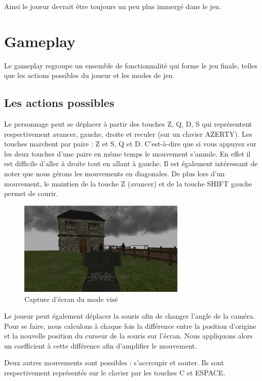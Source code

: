 \documentclass[11pt]{report}
\begin{document}
Ainsi le joueur devrait être toujours un peu plus immergé dans le jeu.

\chapter{Gameplay}

Le gameplay regroupe un ensemble de fonctionnalité qui forme le jeu finale, telles que les actions possibles du joueur et les modes de jeu.

\section{Les actions possibles}

Le personnage peut se déplacer à partir des touches Z, Q, D, S qui représentent respectivement avancer, gauche, droite et reculer (sur un clavier AZERTY). Les touches marchent par paire : Z et S, Q et D. C'est-à-dire que si vous appuyez sur les deux touches d'une paire en même temps le mouvement s'annule. En effet il est difficile d'aller à droite tout en allant à gauche. Il est également intéressant de noter que nous gérons les mouvements en diagonales. De plus lors d'un mouvement, le maintien de la touche Z (avancer) et de la touche SHIFT gauche permet de courir.

\begin{figure}[htbp]
\centering
\includegraphics[width=8cm]{viser.png}
\caption{Capture d'écran du mode visé}
\end{figure}

Le joueur peut également déplacer la souris afin de changer l'angle de la caméra. Pour se faire, nous calculons à chaque fois la différence entre la position d'origine et la nouvelle position du curseur de la souris sur l'écran. Nous appliquons alors un coefficient à cette différence afin d'amplifier le mouvement.

Deux autres mouvements sont possibles : s'accroupir et sauter. Ils sont respectivement représentés sur le clavier par les touches C et ESPACE.
\end{document}
